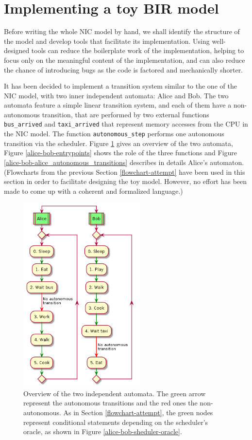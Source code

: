 \documentclass{kththesis}
\begin{document}
\section{Implementing a toy BIR model} \label{alice-bob-toy}

Before writing the whole NIC model by hand, we shall identify the structure of the model and develop tools that facilitate its implementation. Using well-designed tools can reduce the boilerplate work of the implementation, helping to focus only on the meaningful content of the implementation, and can also reduce the chance of introducing bugs as the code is factored and mechanically shorter.

It has been decided to implement a transition system similar to the one of the NIC model, with two inner independent automata: Alice and Bob. The two automata feature a simple linear transition system, and each of them have a non-autonomous transition, that are performed by two external functions \texttt{bus\_arrived} and \texttt{taxi\_arrived} that represent memory accesses from the CPU in the NIC model. The function \texttt{autonomous\_step} performs one autonomous transition via the scheduler. Figure \ref{alice-bob-automata-overview} gives an overview of the two automata, Figure \ref{alice-bob-entrypoints} shows the role of the three functions and Figure \ref{alice-bob-alice_autonomous_transitions} describes in details Alice's automaton. (Flowcharts from the previous Section \ref{flowchart-attempt} have been used in this section in order to facilitate designing the toy model. However, no effort has been made to come up with a coherent and formalized language.)

\begin{figure}[p]
	\includegraphics[height=10cm]{figures/alice-bob-automata-overview.png}
	\centering
	\caption{Overview of the two independent automata. The green arrow represent the autonomous transitions and the red ones the non-autonomous. As in Section \ref{flowchart-attempt}, the green nodes represent conditional statements depending on the scheduler's oracle, as shown in Figure \ref{alice-bob-sheduler-oracle}.}
	\label{alice-bob-automata-overview}
\end{figure}
\end{document}

